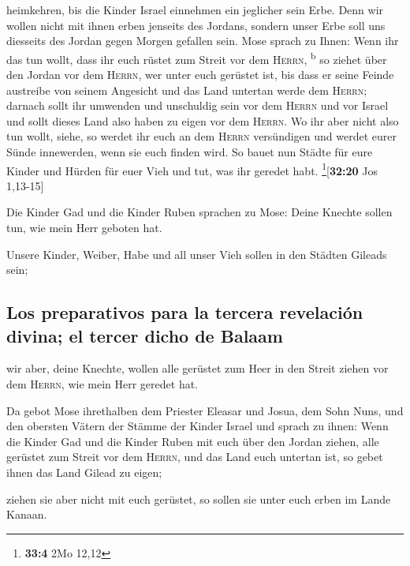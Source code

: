 heimkehren, bis die Kinder Israel einnehmen ein jeglicher sein Erbe.
 Denn wir wollen nicht mit ihnen erben jenseits des
Jordans, sondern unser Erbe soll uns diesseits des Jordan gegen Morgen
gefallen sein.  Mose sprach zu Ihnen: Wenn ihr das tun
wollt, dass ihr euch rüstet zum Streit vor dem \textsc{Herrn},
\textsuperscript{b}  so ziehet über den Jordan vor dem
\textsc{Herrn}, wer unter euch gerüstet ist, bis dass er seine Feinde
austreibe von seinem Angesicht  und das Land untertan
werde dem \textsc{Herrn}; darnach sollt ihr umwenden und unschuldig sein
vor dem \textsc{Herrn} und vor Israel und sollt dieses Land also haben
zu eigen vor dem \textsc{Herrn}.  Wo ihr aber nicht also
tun wollt, siehe, so werdet ihr euch an dem \textsc{Herrn} versündigen
und werdet eurer Sünde innewerden, wenn sie euch finden wird.
 So bauet nun Städte für eure Kinder und Hürden für euer
Vieh und tut, was ihr geredet habt. \footnote{\textbf{33:4} 2Mo 12,12}{[}\textbf{32:20}
Jos 1,13-15{]}

 Die Kinder Gad und die Kinder Ruben sprachen zu Mose:
Deine Knechte sollen tun, wie mein Herr geboten hat.

 Unsere Kinder, Weiber, Habe und all unser Vieh sollen in
den Städten Gileads sein;

\hypertarget{los-preparativos-para-la-tercera-revelaciuxf3n-divina-el-tercer-dicho-de-balaam}{%
\subsection{Los preparativos para la tercera revelación divina; el
tercer dicho de
Balaam}\label{los-preparativos-para-la-tercera-revelaciuxf3n-divina-el-tercer-dicho-de-balaam}}

 wir aber, deine Knechte, wollen alle gerüstet zum Heer
in den Streit ziehen vor dem \textsc{Herrn}, wie mein Herr geredet hat.

 Da gebot Mose ihrethalben dem Priester Eleasar und
Josua, dem Sohn Nuns, und den obersten Vätern der Stämme der Kinder
Israel  und sprach zu ihnen: Wenn die Kinder Gad und die
Kinder Ruben mit euch über den Jordan ziehen, alle gerüstet zum Streit
vor dem \textsc{Herrn}, und das Land euch untertan ist, so gebet ihnen
das Land Gilead zu eigen;

 ziehen sie aber nicht mit euch gerüstet, so sollen sie
unter euch erben im Lande Kanaan.

